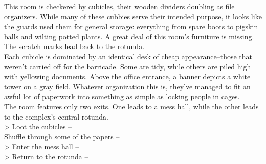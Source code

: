 This room is checkered by cubicles, their wooden dividers doubling as file organizers. While many of these cubbies serve their intended purpose, it looks like the guards used them for general storage: everything from spare boots to pigskin balls and wilting potted plants. A great deal of this room’s furniture is missing. The scratch marks lead back to the rotunda.\\

Each cubicle is dominated by an identical desk of cheap appearance--those that weren’t carried off for the barricade. Some are tidy, while others are piled high with yellowing documents. Above the office entrance, a banner depicts a white tower on a gray field. Whatever organization this is, they've managed to fit an awful lot of paperwork into something as simple as locking people in cages.\\

The room features only two exits. One leads to a mess hall, while the other leads to the complex's central rotunda.\\

> Loot the cubicles -- \\
 Shuffle through some of the papers -- \\
> Enter the mess hall -- \\
> Return to the rotunda -- 